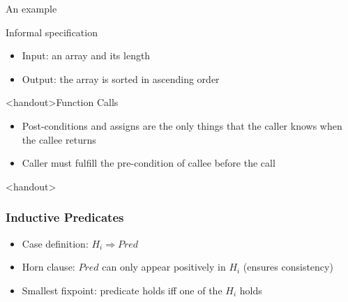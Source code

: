 \documentclass[pdf]{beamer}
\begin{document}
\begin{frame}{An example}
  \begin{block}{Informal specification}
    \begin{itemize}
      \item Input: an array and its length
      \item Output: the array is sorted in ascending order
    \end{itemize}
  \end{block}
  
\end{frame}

\begin{frame}<handout>{Function Calls}
  \begin{itemize}
    \item Post-conditions and assigns are the only things that the
      caller knows when the callee returns
    \item Caller must fulfill the pre-condition of callee before the call
  \end{itemize}
\end{frame}

\begin{frame}<handout>
  \frametitle{Inductive Predicates}
    \begin{itemize}
    \item Case definition: $H_i \Rightarrow Pred$
    \item Horn clause: $Pred$ can only appear positively in $H_i$
      (ensures consistency)
    \item Smallest fixpoint: predicate holds iff one of the $H_i$ holds
    \end{itemize}
  
\end{frame}
\end{document}
